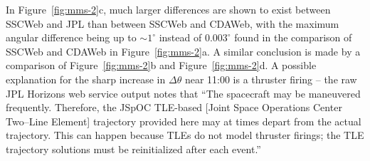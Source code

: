 \documentclass[draft]{agujournal2019}
\begin{document}
In Figure~\ref{fig:mms-2}c, much larger differences are shown to exist between SSCWeb and JPL than between SSCWeb and CDAWeb, with the maximum angular difference being up to ${\sim}1^\circ$ instead of $0.003^\circ$ found in the comparison of SSCWeb and CDAWeb in Figure~\ref{fig:mms-2}a. A similar conclusion is made by a comparison of Figure~\ref{fig:mms-2}b and Figure~\ref{fig:mms-2}d. A possible explanation for the sharp increase in $\Delta \theta$ near 11:00 is a thruster firing -- the raw JPL Horizons web service output notes that ``The spacecraft may be maneuvered frequently. Therefore, the JSpOC TLE-based [Joint Space Operations Center Two--Line Element] trajectory provided here may at times depart from the actual trajectory. This can happen because TLEs do not model thruster firings; the TLE trajectory solutions must be reinitialized after each event.''





\end{document}
